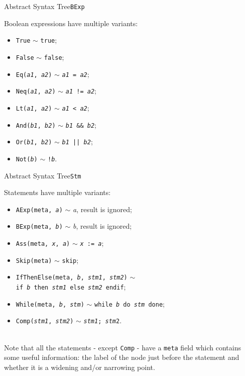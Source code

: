 \documentclass{beamer}
\newcommand{\sskip}{\texttt{skip}}
\begin{document}
\begin{frame}{Abstract Syntax Tree}{\texttt{BExp}}

    Boolean expressions have multiple variants:
    \begin{itemize}
        \item \texttt{True} $\sim$ \texttt{true};
        \item \texttt{False} $\sim$ \texttt{false};
        \item \texttt{Eq(\textit{a1}, \textit{a2})} $\sim$ \texttt{\textit{a1} = \textit{a2}};
        \item \texttt{Neq(\textit{a1}, \textit{a2})} $\sim$ \texttt{\textit{a1} != \textit{a2}};
        \item \texttt{Lt(\textit{a1}, \textit{a2})} $\sim$ \texttt{\textit{a1} < \textit{a2}};
        \item \texttt{And(\textit{b1}, \textit{b2})} $\sim$ \texttt{\textit{b1} \&\& \textit{b2}};
        \item \texttt{Or(\textit{b1}, \textit{b2})} $\sim$ \texttt{\textit{b1} || \textit{b2}};
        \item \texttt{Not(\textit{b})} $\sim$ \texttt{!\textit{b}}.
    \end{itemize}

\end{frame}

\begin{frame}{Abstract Syntax Tree}{\texttt{Stm}}

    Statements have multiple variants:
    \begin{itemize}
        \item \texttt{AExp(meta, \textit{a})} $\sim$ \textit{a}, result is ignored;
        \item \texttt{BExp(meta, \textit{b})} $\sim$ \textit{b}, result is ignored;
        \item \texttt{Ass(meta, \textit{x}, \textit{a})} $\sim$ \texttt{\textit{x} := \textit{a}};
        \item \texttt{Skip(meta)} $\sim$ \sskip;
        \item \texttt{IfThenElse(meta, \textit{b}, \textit{stm1}, \textit{stm2})} $\sim$ \\
              \hskip 1.5cm \texttt{if \textit{b} then \textit{stm1} else \textit{stm2} endif};
        \item \texttt{While(meta, \textit{b}, \textit{stm})} $\sim$ \texttt{while \textit{b} do \textit{stm} done};
        \item \texttt{Comp(\textit{stm1}, \textit{stm2})} $\sim$ \texttt{\textit{stm1}; \textit{stm}2}.
    \end{itemize}

    ~\\
    Note that all the statements - except \texttt{Comp} - have a \texttt{meta} field which contains some useful information: the label of the node just before the statement and whether it is a widening and/or narrowing point.

\end{frame}
\end{document}
